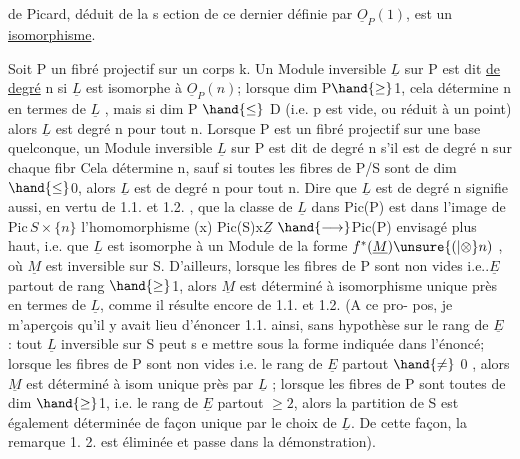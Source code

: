 de Picard, déduit de la s ection de ce dernier définie par $\underline{O}_P(1)$, est un
\uline{isomorphisme}.

Soit P un fibré projectif sur un corps k. Un Module inversible
$\underline{L}$ sur P est dit \uline{de degré} n si $\underline{L}$ est isomorphe à $\underline{O}_P(n)$; lorsque
dim P$\hand{\geq}$1, cela détermine n en termes de $\underline{L}$ , mais si dim P $\hand{\leq}$ D
(i.e. p est vide, ou réduit à un point) alors $\underline{L}$ est degré n pour tout n.
Lorsque P est un fibré projectif sur une base quelconque, un Module
inversible $\underline{L}$ sur P est dit de degré n s'il est de degré n sur chaque fibr
Cela détermine n, sauf si toutes les fibres de P/S sont de dim$\hand{\leq}$0, alors
$\underline{L}$ est de degré n pour tout n. Dire que $\underline{L}$ est de degré n signifie aussi,
en vertu de 1.1. et 1.2. , que la classe  de $\underline{L}$ dans Pic(P) est dans
l'image de $\mathrm{Pic}\,S\times\{n\}$  l'homomorphisme (x) Pic(S)x$\underline{Z}$ $\hand{\longrightarrow}$Pic(P) envisagé plus haut,
i.e. que $\underline{L}$ est isomorphe à un Module de la forme $f^*(\underline{M})\unsure{(|\otimes}n)$ , où $\underline{M}$ est
inversible sur S. D'ailleurs, lorsque les fibres de P sont non vides
i.e..$\underline{E}$ partout de rang $\hand{\geq}$1, alors $\underline{M}$ est déterminé à isomorphisme unique\placedmargin{\ensuremath{/}}
\placedmargin{\textbar}près en termes de $\underline{L}$, comme il résulte encore de 1.1. et 1.2. (A ce pro-%
pos, je m'aperçois qu'il y avait lieu d'énoncer 1.1. ainsi, sans hypothèse
sur le rang de $\underline{E}$ : tout $\underline{L}$ inversible sur S peut s e mettre sous la forme
indiquée dans l'énoncé; lorsque les fibres de P sont non vides i.e. le
rang de $\underline{E}$ partout $\hand{\neq}$ 0 , alors $\underline{M}$ est déterminé à isom unique près par
$\underline{L}$ ; lorsque les fibres de P sont toutes de dim $\hand{\geq}$1, i.e. le rang de $\underline{E}$ partout $\geq 2$, alors la partition
de S est également déterminée de façon unique par le choix de $\underline{L}$. De cette
façon, la remarque 1. 2. est éliminée et passe dans la démonstration).\placedmargin{\ensuremath{\swarrow}}

